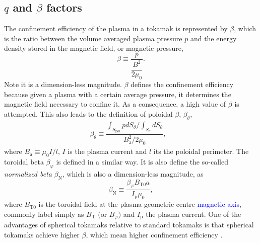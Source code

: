\documentclass[a4paper,12pt,oneside]{book}
\begin{document}
\subsection{$q$ and $\beta$ factors}
\label{section q beta}
The confinement efficiency of the plasma in a tokamak is represented by $\beta$, which is the ratio between the volume averaged plasma pressure $p$ and the energy density stored in the magnetic field, or magnetic pressure,
%
\begin{equation} \label{def beta}
\beta \equiv \dfrac{p}{\dfrac{B^2}{2 \mu_{0}}}.
\end{equation}
%
Note it is a dimension-less magnitude. $\beta$ defines the confinement efficiency because given a plasma with a certain average pressure, it determines the magnetic field necessary to confine it. As a consequence, a high value of $\beta$ is attempted. This also leads to the definition of poloidal $\beta$, $\beta_{\theta}$,
%
\begin{equation}
\begin{array}{cc}

\beta_{\theta} \equiv \dfrac{\int_{S_\text{pol}} p dS_\theta / \int_{S_\theta} dS_\theta}{B_\text{a}^2/2 \mu_0}, &
\end{array}
\end{equation}
%
where $B_\text{a} \equiv \mu_0 I/l$, $I$ is the plasma current and $l$ its the poloidal perimeter. The toroidal beta $\beta_\varphi$ is defined in a similar way. It is also define the so-called \textit{normalized beta} $\beta_\text{N}$, which is also a dimension-less magnitude, as
%
\begin{equation}
\beta_\text{N} \equiv \dfrac{\beta_\varphi B_{\text{T}0} a}{I_\text{p} \mu_0},
\end{equation}
%
where $B_{\text{T}0}$ is the toroidal field at the plasma \st{geometric centre} \textcolor{blue}{magnetic axis}, commonly label simply as $B_\text{T}$ (or $B_\varphi)$ and $I_\text{p}$ the plasma current. One of the advantages of spherical tokamaks relative to standard tokamaks is that spherical tokamaks achieve higher $\beta$, which mean higher confinement efficiency \cite{ST_vs_T}.
\end{document}
